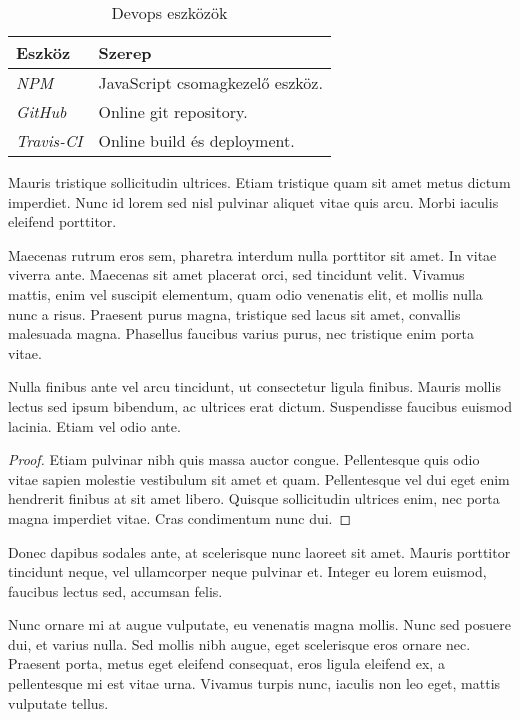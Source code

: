 \begin{table}[H]
	\centering
	\begin{tabular}{ | m{} | m{} | }
		\hline
		\textbf{Eszköz} & \textbf{Szerep} \\
		\hline \hline
		\emph{NPM} \cite{NPM} & JavaScript csomagkezelő eszköz.  \\
		\hline
		\emph{GitHub} \cite{Github} & Online git repository.  \\
		\hline
		\emph{Travis-CI} \cite{Travis} & Online build és deployment.  \\
		\hline
	\end{tabular}
	\caption{Devops eszközök}
	\label{tab:technologies}
\end{table}


\begin{definition}
Mauris tristique sollicitudin ultrices. Etiam tristique quam sit amet metus dictum imperdiet. Nunc id lorem sed nisl pulvinar aliquet vitae quis arcu. Morbi iaculis eleifend porttitor.
\end{definition}

Maecenas rutrum eros sem, pharetra interdum nulla porttitor sit amet. In vitae viverra ante. Maecenas sit amet placerat orci, sed tincidunt velit. Vivamus mattis, enim vel suscipit elementum, quam odio venenatis elit, et mollis nulla nunc a risus. Praesent purus magna, tristique sed lacus sit amet, convallis malesuada magna. Phasellus faucibus varius purus, nec tristique enim porta vitae.

\begin{theorem}
Nulla finibus ante vel arcu tincidunt, ut consectetur ligula finibus. Mauris mollis lectus sed ipsum bibendum, ac ultrices erat dictum. Suspendisse faucibus euismod lacinia. Etiam vel odio ante.
\end{theorem}
\begin{proof}
Etiam pulvinar nibh quis massa auctor congue. Pellentesque quis odio vitae sapien molestie vestibulum sit amet et quam. Pellentesque vel dui eget enim hendrerit finibus at sit amet libero. Quisque sollicitudin ultrices enim, nec porta magna imperdiet vitae. Cras condimentum nunc dui.
\end{proof}

Donec dapibus sodales ante, at scelerisque nunc laoreet sit amet. Mauris porttitor tincidunt neque, vel ullamcorper neque pulvinar et. Integer eu lorem euismod, faucibus lectus sed, accumsan felis.

\begin{remark}
Nunc ornare mi at augue vulputate, eu venenatis magna mollis. Nunc sed posuere dui, et varius nulla. Sed mollis nibh augue, eget scelerisque eros ornare nec. Praesent porta, metus eget eleifend consequat, eros ligula eleifend ex, a pellentesque mi est vitae urna. Vivamus turpis nunc, iaculis non leo eget, mattis vulputate tellus.
\end{remark}

